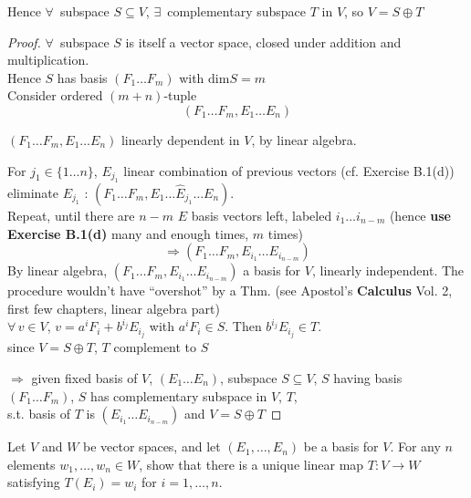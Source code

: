 Hence $\forall \, $ subspace $S \subseteq V$, $\exists \, $ complementary subspace $T$ in $V$, so $V = S \oplus T$

\begin{proof}
$\forall \, $ subspace $S$ is itself a vector space, closed under addition and multiplication. \\
\phantom{ \quad } Hence $S$ has basis $(F_1 \dots F_m)$ with $\text{dim}S = m$ \\

Consider ordered $(m+n)$-tuple 
\[
(F_1 \dots F_m, E_1 \dots E_n)
\]

$(F_1 \dots F_m, E_1 \dots E_n)$ linearly dependent in $V$, by linear algebra. 

For $j_1 \in \lbrace 1 \dots n \rbrace$, $E_{j_1}$ linear combination of previous vectors (cf. Exercise B.1(d)) \\
\phantom{ \quad } eliminate $E_{j_1}$ : $(F_1 \dots F_m, E_1 \dots \widehat{E}_{j_1} \dots E_n )$. \\

Repeat, until there are $n-m$ $E$ basis vectors left, labeled $i_1 \dots i_{n-m}$ (hence \textbf{use Exercise B.1(d)} many and enough times, $m$ times)
\[
\Longrightarrow (F_1 \dots F_m, E_{i_1} \dots E_{i_{n-m}} )
\]
By linear algebra, $(F_1 \dots F_m, E_{i_1} \dots E_{i_{n-m}})$ a basis for $V$, linearly independent. The procedure wouldn't have ``overshot'' by a Thm. (see Apostol's \textbf{Calculus} Vol. 2, first few chapters, linear algebra part) \\

$\forall \, v\in V$, $v= a^iF_i  + b^{i_j} E_{i_j}$ with $a^i F_i \in S$.  Then $b^{i_j} E_{i_j} \in T$.  \\
\phantom{ \quad } since $V = S\oplus T$, $T$ complement to $S$

$\Longrightarrow $ given fixed basis of $V$, $(E_1 \dots E_n)$, subspace $S \subseteq V$, $S$ having basis $(F_1 \dots F_m)$, $S$ has complementary subspace in $V$, $T$, \\
\phantom{ \quad } s.t. basis of $T$ is $(E_{i_1} \dots E_{i_{n-m}})$ and $V = S\oplus T$

\end{proof}


\begin{exercise}
Let $V$ and $W$ be vector spaces, and let $(E_1,\ldots,E_n)$ be a basis for $V$. For any $n$ elements $w_1,\ldots,w_n\in W$, show that there is a unique linear map $T\colon V\to W$ satisfying $T(E_i)=w_i$ for $i=1,\ldots,n$.
\end{exercise}

